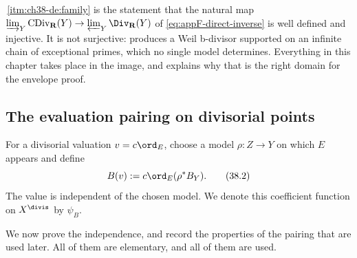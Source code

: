 \begin{remark}
\label{rem:ch38-direct-inverse}
\,\cref{itm:ch38-de:family} is the
statement that the natural map
$\varinjlim_Y\operatorname{CDiv}_{\mathbf R}(Y)
\to\varprojlim_Y\Div_{\mathbf R}(Y)$ of
\eqref{eq:appF-direct-inverse} is well defined and injective.  It is not
surjective:  produces a Weil b-divisor
supported on an infinite chain of exceptional primes, which no single
model determines.  Everything in this chapter takes place in the image, and
 explains why that is the right domain for
the envelope proof.
\end{remark}

\subsection{The evaluation pairing on divisorial points}
\label{sec:ch38-evaluation-divisorial}

For a divisorial valuation $v=c\ord_E$, choose a model
$\rho:Z\to Y$ on which $E$ appears and define
\[
                       B(v):=c\ord_E(\rho^*B_Y).
\tag{38.2}\label{eq:bj-bdivisor-evaluation}
\]
The value is independent of the chosen model.  We denote this coefficient
function on $X^{\divis}$ by $\psi_B$.

We now prove the independence, and record the properties of the pairing
that are used later.  All of them are elementary, and all of them are used.

